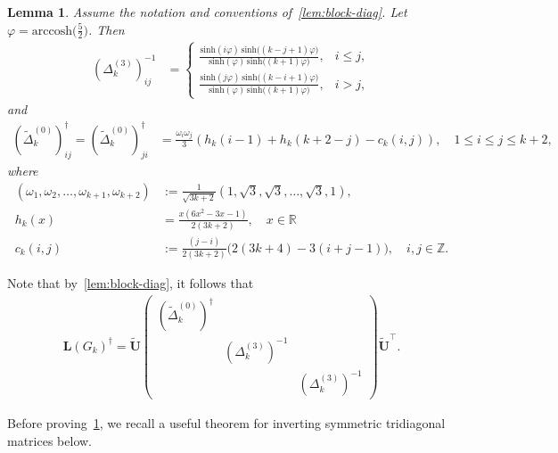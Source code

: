 \documentclass[11pt,a4paper]{amsart}
\newtheorem{lemma}[theorem]{Lemma}
\begin{document}
\begin{lemma}\label{lem:block-pinv}
    Assume the notation and conventions of~\cref{lem:block-diag}. Let $\varphi = \mathrm{arccosh}\bigl(\tfrac{5}{2}\bigr)$. Then
        \begin{align*}
            (\Delta_k^{(3)})^{-1}_{ij}
            &=
            \begin{cases}
            \displaystyle
            \frac{\mathrm{sinh}(i\varphi)\,\mathrm{sinh}\bigl((k-j+1)\varphi\bigr)}
                {\mathrm{sinh}(\varphi)\,\mathrm{sinh}\bigl((k+1)\varphi\bigr)},
            & i \le j,\\
            \displaystyle
            \frac{\mathrm{sinh}(j\varphi)\,\mathrm{sinh}\bigl((k-i+1)\varphi\bigr)}
                {\mathrm{sinh}(\varphi)\,\mathrm{sinh}\bigl((k+1)\varphi\bigr)},
            & i > j,
            \end{cases}
        \end{align*}
    and 
        \begin{align*}
            (\widetilde{\Delta}_k^{(0)})^\dagger_{ij} = (\widetilde{\Delta}_k^{(0)})^\dagger_{ji} &= \frac{\omega_i \omega_j}{3}\left(h_k(i-1) + h_k(k+2-j)- c_k(i, j)\right),\quad 1\leq i\leq j\leq k+2,
        \end{align*}    
    where
        \begin{align*}
            (\omega_1, \omega_2, \dotsc, \omega_{k+1}, \omega_{k+2}) &:= \frac{1}{\sqrt{3k+2}} (1, \sqrt{3}, \sqrt{3}, \dotsc, \sqrt{3}, 1),\\
            h_k(x) &= \frac{x(6x^2 - 3x - 1)}{2(3k+2)}, \quad x\in\mathbb{R}\\
            c_k(i, j) &:= \frac{(j-i)}{2(3k+2)}\bigl(2(3k+4)-3(i+j-1)\bigr), \quad i, j\in\mathbb{Z}.
        \end{align*}
\end{lemma}

Note that by~\cref{lem:block-diag}, it follows that
    \begin{align}\label{eq:lap-pinv}
        \mathbf{L}(G_k)^\dagger = \widetilde{\mathbf{U}} \begin{pmatrix}
            (\widetilde{\Delta}_k^{(0)})^\dagger & & \\
            & (\Delta_k^{(3)})^{-1} & \\
            & & (\Delta_k^{(3)})^{-1}
        \end{pmatrix} \widetilde{\mathbf{U}}^\top.
    \end{align}

Before proving~\cref{lem:block-pinv}, we recall a useful theorem for inverting symmetric tridiagonal matrices below.
\end{document}
